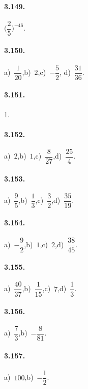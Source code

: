 \begin{multicols}{2}
\paragraph{3.149.}
$\bigg(\dfrac{2}{5}\bigg)^{-46}$.

\paragraph{3.150.}
a)~$\dfrac{1}{20}$,\quad b)~$2$,\quad c)~$-\dfrac{5}{2}$,\quad %
d)~$\dfrac{31}{36}$.

\paragraph{3.151.}1.

\paragraph{3.152.}
a)~$2$,\quad b)~$1$,\quad c)~$\dfrac{8}{27}$,\quad d)~$\dfrac{25}{4}$.

\paragraph{3.153.}
a)~$\dfrac{9}{5}$,\quad b)~$\dfrac{1}{3}$,\quad c)~$\dfrac{3}{2}$,\quad d)~$\dfrac{35}{19}$.

\paragraph{3.154.}
a)~$-\dfrac{9}{2}$,\quad b)~$1$,\quad c)~$2$,\quad d)~$\dfrac{38}{45}$.

\paragraph{3.155.}
a)~$\dfrac{40}{37}$,\quad b)~$\dfrac{1}{15}$,\quad c)~$7$,\quad d)~$\dfrac{1}{3}$.

\paragraph{3.156.}
a)~$\dfrac{7}{3}$,\quad b)~$-\dfrac{8}{81}$.

\paragraph{3.157.}
a)~$100$,\quad b)~$-\dfrac{1}{2}$.



\end{multicols}
